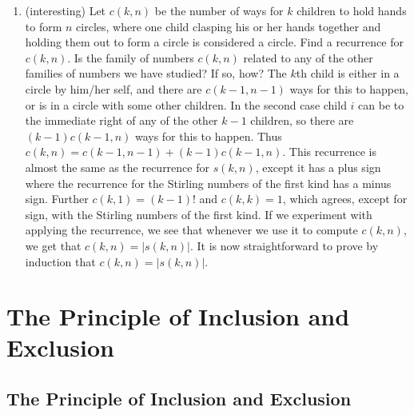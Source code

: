 \documentclass[10pt,]{book}
\theoremstyle{plain}
\theoremstyle{definition}
\numberwithin{equation}{chapter}
\begin{document}
\begin{enumerate}
%
\item\hypertarget{li-71}{}(interesting) Let \(c(k,n)\) be the number of ways for \(k\) children to hold hands to form \(n\) circles, where one child clasping his or her hands together and holding them out to form a circle is considered a circle.  Find a recurrence for \(c(k,n)\).  Is the family of numbers \(c(k,n)\) related to any of the other families of numbers we have studied? If so, how? The \(k\)th child is either in a circle by him/her self, and there are \(c(k-1,n-1)\) ways for this to happen, or is in a circle with some other children. In the second case child \(i\) can be to the immediate right of any of the other \(k-1\) children, so there are \((k-1)c(k-1,n)\) ways for this to happen. Thus \(c(k,n)=c(k-1,n-1)
+(k-1)c(k-1,n)\). This recurrence is almost the same as the recurrence for \(s(k,n)\), except it has a plus sign where the recurrence for the Stirling numbers of the first kind has a minus sign. Further \(c(k,1)=(k-1)!\) and \(c(k,k)=1\), which agrees, except for sign, with the Stirling numbers of the first kind. If we experiment with applying the recurrence, we see that whenever we use it to compute \(c(k,n)\), we get that \(c(k,n)=|s(k,n)|\). It is now straightforward to prove by induction that \(c(k,n)=|s(k,n)|\).%
%
\end{enumerate}
\typeout{************************************************}
\typeout{************************************************}
\chapter[{The Principle of Inclusion and Exclusion}]{The Principle of Inclusion and Exclusion}\label{chapter-4}
\typeout{************************************************}
\typeout{************************************************}
\section[{The Principle of Inclusion and Exclusion}]{The Principle of Inclusion and Exclusion}\label{sec_inclexcl-inclexcl}
\typeout{************************************************}
\typeout{************************************************}
\end{document}
